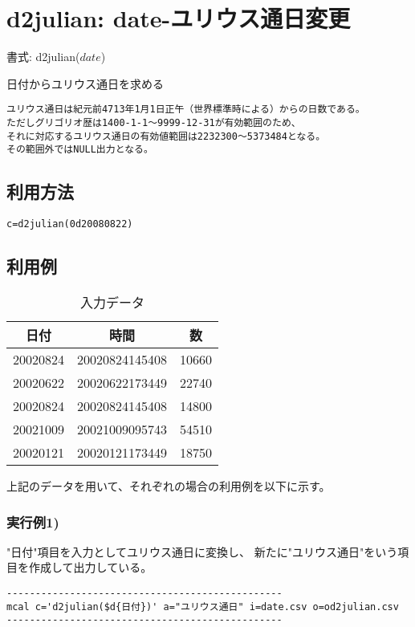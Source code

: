 
%

\section{d2julian: date-ユリウス通日変更\label{sect:d2julian}}

書式: d2julian($date$)

日付からユリウス通日を求める 
\begin{verbatim}
ユリウス通日は紀元前4713年1月1日正午（世界標準時による）からの日数である。
ただしグリゴリオ歴は1400-1-1～9999-12-31が有効範囲のため、
それに対応するユリウス通日の有効値範囲は2232300～5373484となる。
その範囲外ではNULL出力となる。
\end{verbatim}

\subsection*{利用方法}
\begin{verbatim}
c=d2julian(0d20080822)
\end{verbatim}

\subsection*{利用例}

\begin{table}[hbt]
\begin{center}
 \caption{入力データ}
  \begin{tabular}{|c|c|c|} \hline
日付&時間&数\\ \hline\hline
20020824&20020824145408&10660\\ \hline
20020622&20020622173449&22740\\ \hline
20020824&20020824145408&14800\\ \hline
20021009&20021009095743&54510\\ \hline
20020121&20020121173449&18750\\ \hline
  \end{tabular}
  \end{center}
\end{table}

上記のデータを用いて、それぞれの場合の利用例を以下に示す。

\subsubsection*{実行例1)}
"日付"項目を入力としてユリウス通日に変換し、
新たに"ユリウス通日"をいう項目を作成して出力している。
\begin{verbatim}
------------------------------------------------
mcal c='d2julian($d{日付})' a="ユリウス通日" i=date.csv o=od2julian.csv
------------------------------------------------
\end{verbatim}

